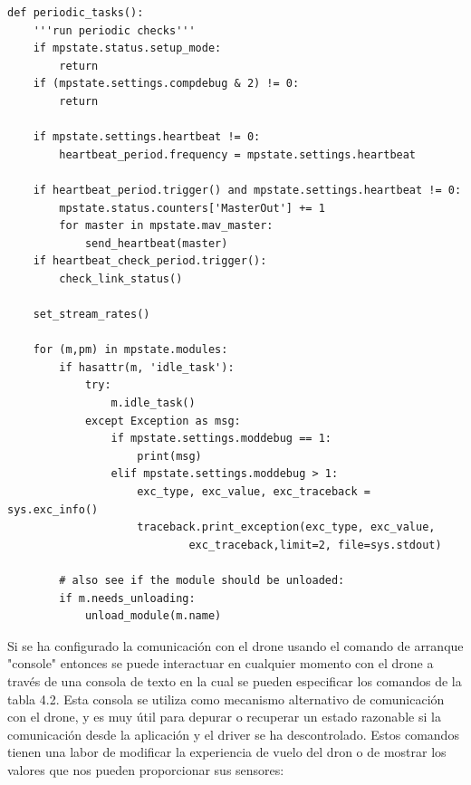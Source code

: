\begin{lstlisting}[frame=single]
def periodic_tasks():
    '''run periodic checks'''
    if mpstate.status.setup_mode:
        return
    if (mpstate.settings.compdebug & 2) != 0:
        return

    if mpstate.settings.heartbeat != 0:
        heartbeat_period.frequency = mpstate.settings.heartbeat

    if heartbeat_period.trigger() and mpstate.settings.heartbeat != 0:
        mpstate.status.counters['MasterOut'] += 1
        for master in mpstate.mav_master:
            send_heartbeat(master)
    if heartbeat_check_period.trigger():
        check_link_status()

    set_stream_rates()

    for (m,pm) in mpstate.modules:
        if hasattr(m, 'idle_task'):
            try:
                m.idle_task()
            except Exception as msg:
                if mpstate.settings.moddebug == 1:
                    print(msg)
                elif mpstate.settings.moddebug > 1:
                    exc_type, exc_value, exc_traceback = sys.exc_info()
                    traceback.print_exception(exc_type, exc_value, 
                    		exc_traceback,limit=2, file=sys.stdout)

        # also see if the module should be unloaded:
        if m.needs_unloading:
            unload_module(m.name)
\end{lstlisting}

Si se ha configurado la comunicación con el drone usando el comando de arranque "console" entonces se puede interactuar en cualquier momento con el drone a través de una consola de texto en la cual se pueden especificar los comandos de la tabla 4.2. Esta consola se utiliza como mecanismo alternativo de comunicación con el drone, y es muy útil para depurar o recuperar un estado razonable si la comunicación desde la aplicación y el driver se ha descontrolado. Estos comandos tienen una labor de modificar la experiencia de vuelo del dron o de mostrar los valores que nos pueden proporcionar sus sensores:

